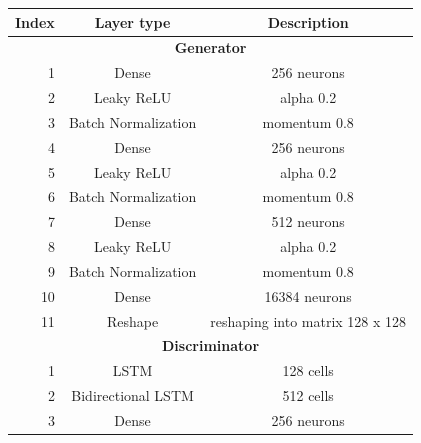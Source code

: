 \documentclass[]{article}
\begin{document}
\begin{table}[]
	\centering
	\begin{tabular}{|r|c|c|}
		\hline
		\multicolumn{1}{|c|}{\textbf{Index}} & \textbf{Layer type} & \textbf{Description}                  \\ \hline
		\multicolumn{3}{|c|}{\textbf{Generator}}                                                           \\ \hline
		1                                    & Dense               & 256 neurons                           \\ \hline
		2                                    & Leaky ReLU          & alpha 0.2                             \\ \hline
		3                                    & Batch Normalization & momentum 0.8                          \\ \hline
		4                                    & Dense               & 256 neurons                           \\ \hline
		5                                    & Leaky ReLU          & alpha 0.2                             \\ \hline
		6                                    & Batch Normalization & momentum 0.8                          \\ \hline
		7                                    & Dense               & 512 neurons                           \\ \hline
		8                                    & Leaky ReLU          & alpha 0.2                             \\ \hline
		9                                    & Batch Normalization & momentum 0.8                          \\ \hline
		10                                   & Dense               & 16384 neurons                         \\ \hline
		11                                   & Reshape             & reshaping into matrix 128 x 128       \\ \hline
		\multicolumn{3}{|c|}{\textbf{Discriminator}}                                                       \\ \hline
		1                                    & LSTM                & 128 cells                             \\ \hline
		2                                    & Bidirectional LSTM  & 512 cells                             \\ \hline
		3                                    & Dense               & 256 neurons                           \\ \hline

\end{tabular}
\end{table}
\end{document}
